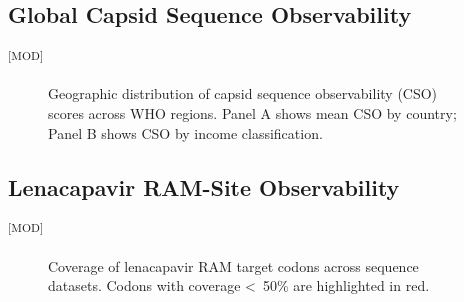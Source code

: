 \documentclass[12pt]{article}
\newcommand{\GradeModerate}{\textsuperscript{\textsf{[MOD]}}}
\begin{document}


\begin{table}[htbp]
    \centering
    \caption{HIV-1 sequence coverage by genomic region and data source.}\label{tab:sequence_coverage}
    
\end{table}

\subsection{Global Capsid Sequence Observability}\label{sec:results_cso}\GradeModerate



\begin{figure}[htbp]
    \centering
    
    \caption[Global CSO distribution]{Geographic distribution of capsid
    sequence observability (CSO) scores across WHO regions. Panel A shows
    mean CSO by country; Panel B shows CSO by income classification.}\label{fig:global_cso}
\end{figure}

\begin{table}[htbp]
    \centering
    \caption{CSO scores by WHO region and country income classification.}\label{tab:cso_by_region}
    
\end{table}

\subsection{Lenacapavir RAM-Site Observability}\label{sec:results_ram_site}\GradeModerate



\begin{figure}[htbp]
    \centering
    
    \caption[RAM-site coverage by codon position]{Coverage of lenacapavir
    RAM target codons across sequence datasets. Codons with coverage
    \textless\ 50\% are highlighted in red.}\label{fig:ram_coverage}
\end{figure}
\end{document}
